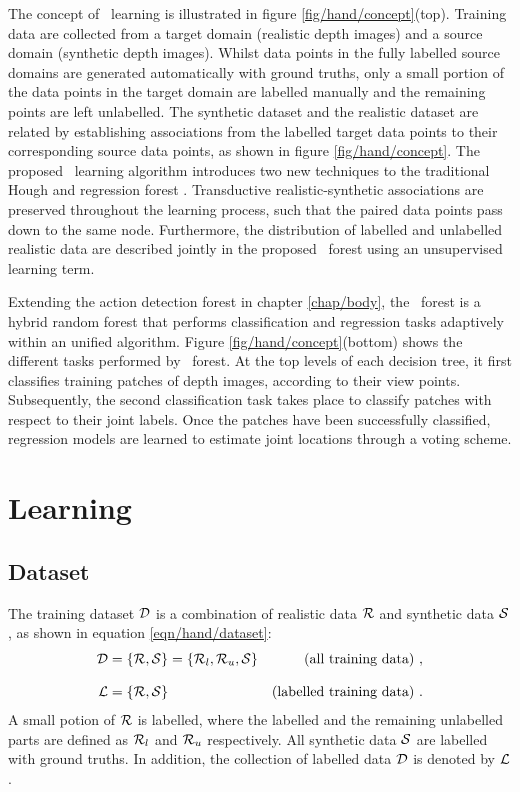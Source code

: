 The concept of \STR\ learning is illustrated in figure \ref{fig/hand/concept}(top). 
Training data are collected from a target domain (realistic depth images) and a source domain (synthetic depth images). Whilst data points in the fully labelled source domains are generated automatically with ground truths, only a small portion of the data points in the target domain are labelled manually and the remaining points are left unlabelled. 
The synthetic dataset and the realistic dataset are related by establishing associations from the labelled target data points to their corresponding source data points, as shown in figure \ref{fig/hand/concept}. The proposed \STR\ learning algorithm introduces two new techniques to the traditional Hough and regression forest \cite{Gall2011}. 
Transductive realistic-synthetic associations are preserved throughout the learning process, such that the paired data points pass down to the same node. 
Furthermore, the distribution of labelled and unlabelled realistic data are described jointly in the proposed \STR\ forest using an unsupervised learning term. 

Extending the action detection forest in chapter \ref{chap/body}, the \STR\ forest is a hybrid random forest that performs classification and regression tasks adaptively within an unified algorithm. Figure \ref{fig/hand/concept}(bottom) shows the different tasks performed by \STR\ forest. At the top levels of each decision tree, it first classifies training patches of depth images, according to their view points. Subsequently, the second classification task takes place to classify patches with respect to their joint labels. Once the patches have been successfully classified, regression models are learned to estimate joint locations through a voting scheme.  

\section{Learning} 

\subsection{Dataset}
\label{sec/hand/dataset} 

The training dataset $\mathcal{D}$ is a combination of realistic data $\mathcal{R}$ and synthetic data $\mathcal{S}$, as shown in equation \ref{eqn/hand/dataset}: 
\begin{equation}
	\label{eqn/hand/dataset} 
	\begin{aligned}
		\mathcal{D} 	& = \left\{ \mathcal{R}, \mathcal{S} \right\} = \left\{ \mathcal{R}_{l}, \mathcal{R}_{u}, \mathcal{S} \right\} & \mbox{(all training data) }, \\[3mm]
		\mathcal{L} 		& = \left\{ \mathcal{R}, \mathcal{S} \right\} & \mbox{(labelled training data) }. \\ 
	\end{aligned}
\end{equation}
A small potion of $\mathcal{R}$ is labelled, where the labelled and the remaining unlabelled parts are defined as $\mathcal{R}_{l}$ and $\mathcal{R}_{u}$ respectively. All synthetic data $\mathcal{S}$ are labelled with ground truths. In addition, the collection of labelled data $\mathcal{D}$ is denoted by $\mathcal{L}$.  

